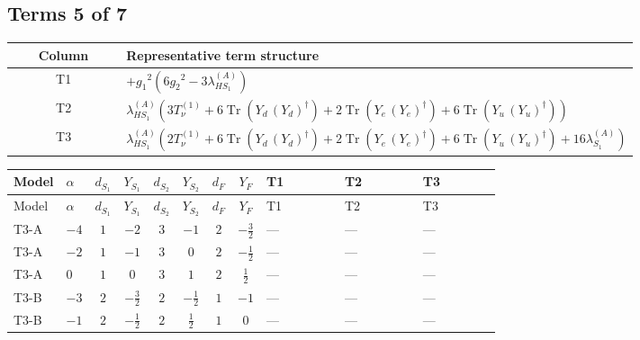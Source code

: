 \documentclass[8pt]{article}
\begin{document}
\begin{landscape}
\subsection*{Terms 5 of 7}
\begin{center}
\begin{tabular}{@{}c >{\raggedright\arraybackslash}p{0.82\linewidth}@{}}
\toprule
Column & Representative term structure \\
\midrule
T1 & \(\displaystyle +{g_1}^2 \left(6 {g_2}^2-3 {\lambda_{HS_1}^{(A)}}\right)\) \\
\midrule
T2 & \(\displaystyle {\lambda_{HS_1}^{(A)}} (3 T_{\nu}^{(1)}+6 \operatorname{Tr}\!\left({Y_d}\,\left({Y_d}\right)^{\dagger}\right)+2 \operatorname{Tr}\!\left({Y_e}\,\left({Y_e}\right)^{\dagger}\right)+6 \operatorname{Tr}\!\left({Y_u}\,\left({Y_u}\right)^{\dagger}\right))\) \\
\midrule
T3 & \(\displaystyle {\lambda_{HS_1}^{(A)}} (2 T_{\nu}^{(1)}+6 \operatorname{Tr}\!\left({Y_d}\,\left({Y_d}\right)^{\dagger}\right)+2 \operatorname{Tr}\!\left({Y_e}\,\left({Y_e}\right)^{\dagger}\right)+6 \operatorname{Tr}\!\left({Y_u}\,\left({Y_u}\right)^{\dagger}\right)+16 {\lambda_{S_1}^{(A)}})\) \\
\midrule
\bottomrule
\end{tabular}
\end{center}
\smallskip
\tiny
\begin{longtable}{@{}llcccccc >{\raggedright\arraybackslash}p{0.21\linewidth} >{\raggedright\arraybackslash}p{0.21\linewidth} >{\raggedright\arraybackslash}p{0.21\linewidth}@{}}
\toprule
Model & $\alpha$ & $d_{S_1}$ & $Y_{S_1}$ & $d_{S_2}$ & $Y_{S_2}$ & $d_F$ & $Y_F$ & T1 & T2 & T3 \\
\midrule
\endfirsthead
\toprule
Model & $\alpha$ & $d_{S_1}$ & $Y_{S_1}$ & $d_{S_2}$ & $Y_{S_2}$ & $d_F$ & $Y_F$ & T1 & T2 & T3 \\
\midrule
\endhead
T3-A & $-4$ & $1$ & $-2$ & $3$ & $-1$ & $2$ & $-\frac{3}{2}$ & --- & --- & --- \\
\midrule
T3-A & $-2$ & $1$ & $-1$ & $3$ & $0$ & $2$ & $-\frac{1}{2}$ & --- & --- & --- \\
\midrule
T3-A & $0$ & $1$ & $0$ & $3$ & $1$ & $2$ & $\frac{1}{2}$ & --- & --- & --- \\
\midrule
T3-B & $-3$ & $2$ & $-\frac{3}{2}$ & $2$ & $-\frac{1}{2}$ & $1$ & $-1$ & --- & --- & --- \\
\midrule
T3-B & $-1$ & $2$ & $-\frac{1}{2}$ & $2$ & $\frac{1}{2}$ & $1$ & $0$ & --- & --- & --- \\

\end{longtable}
\end{landscape}
\end{document}
